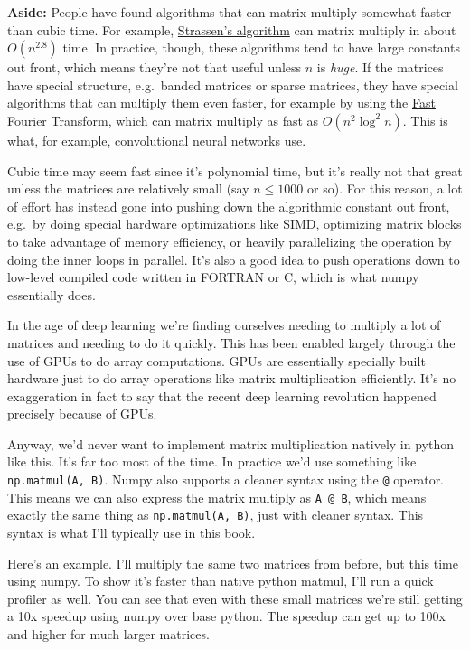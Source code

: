 \documentclass[
  letterpaper,
  DIV=11,
  numbers=noendperiod]{scrreprt}
\begin{document}
\textbf{Aside:} People have found algorithms that can matrix multiply
somewhat faster than cubic time. For example,
\href{https://en.wikipedia.org/wiki/Strassen_algorithm}{Strassen's
algorithm} can matrix multiply in about \(O(n^{2.8})\) time. In
practice, though, these algorithms tend to have large constants out
front, which means they're not that useful unless \(n\) is \emph{huge}.
If the matrices have special structure, e.g.~banded matrices or sparse
matrices, they have special algorithms that can multiply them even
faster, for example by using the
\href{https://en.wikipedia.org/wiki/Fast_Fourier_transform}{Fast Fourier
Transform}, which can matrix multiply as fast as \(O(n^2 \log^2 n)\).
This is what, for example, convolutional neural networks use.

Cubic time may seem fast since it's polynomial time, but it's really not
that great unless the matrices are relatively small (say \(n \leq 1000\)
or so). For this reason, a lot of effort has instead gone into pushing
down the algorithmic constant out front, e.g.~by doing special hardware
optimizations like SIMD, optimizing matrix blocks to take advantage of
memory efficiency, or heavily parallelizing the operation by doing the
inner loops in parallel. It's also a good idea to push operations down
to low-level compiled code written in FORTRAN or C, which is what numpy
essentially does.

In the age of deep learning we're finding ourselves needing to multiply
a lot of matrices and needing to do it quickly. This has been enabled
largely through the use of GPUs to do array computations. GPUs are
essentially specially built hardware just to do array operations like
matrix multiplication efficiently. It's no exaggeration in fact to say
that the recent deep learning revolution happened precisely because of
GPUs.

Anyway, we'd never want to implement matrix multiplication natively in
python like this. It's far too most of the time. In practice we'd use
something like \texttt{np.matmul(A,\ B)}. Numpy also supports a cleaner
syntax using the \texttt{@} operator. This means we can also express the
matrix multiply as \texttt{A\ @\ B}, which means exactly the same thing
as \texttt{np.matmul(A,\ B)}, just with cleaner syntax. This syntax is
what I'll typically use in this book.

Here's an example. I'll multiply the same two matrices from before, but
this time using numpy. To show it's faster than native python matmul,
I'll run a quick profiler as well. You can see that even with these
small matrices we're still getting a 10x speedup using numpy over base
python. The speedup can get up to 100x and higher for much larger
matrices.
\end{document}
